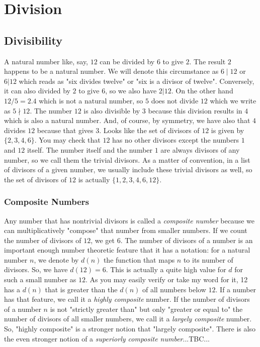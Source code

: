 \section{Division} 

\subsection{Divisibility}
A natural number like, say, $12$ can be divided by $6$ to give $2$. The result $2$ happens to be a natural number. We will denote this circumstance as $6 \mid 12$ or $6 | 12$ which reads as "six divides twelve" or "six is a divisor of twelve". Conversely, it can also divided by $2$ to give $6$, so we also have $2 | 12$. On the other hand $12 / 5 = 2.4$ which is not a natural number, so $5$ does not divide $12$ which we write as $5 \nmid 12$. The number $12$ is also divisible by $3$ because this division results in $4$ which is also a natural number. And, of course, by symmetry, we have also that $4$ divides $12$ because that gives $3$. Looks like the set of divisors of $12$ is given by $\{2,3,4,6\}$. You may check that $12$ has no other divisors except the numbers $1$ and $12$ itself. The number itself and the number $1$ are always divisors of any number, so we call them the trivial divisors. As a matter of convention, in a list of divisors of a given number, we usually include these trivial divisors as well, so the set of divisors of $12$ is actually $\{1,2,3,4,6,12\}$. 


\subsubsection{Composite Numbers}
Any number that has nontrivial divisors is called a \emph{composite number} because we can multiplicatively "compose" that number from smaller numbers. If we count the number of divisors of $12$, we get $6$. The number of divisors of a number is an important enough number theoretic feature that it has a notation: for a natural number $n$, we denote by $d(n)$ the function that maps $n$ to its number of divisors. So, we have $d(12) = 6$. This is actually a quite high value for $d$ for such a small number as $12$. As you may easily verify or take my word for it, 12 has a $d(n)$ that is greater than the $d(n)$ of all numbers below $12$. If a number has that feature, we call it a \emph{highly composite} number. If the number of divisors of a number $n$ is not "strictly greater than" but only "greater or equal to" the number of divisors of all smaller numbers, we call it a \emph{largely composite} number. So, "highly composite" is a stronger notion that "largely composite". There is also the even stronger notion of a \emph{superiorly composite number}...TBC...

